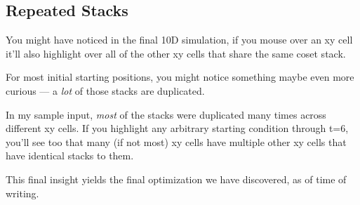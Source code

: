 \documentclass[]{article}
\begin{document}
\hypertarget{repeated-stacks}{%
\subsection{Repeated Stacks}\label{repeated-stacks}}

You might have noticed in the final 10D simulation, if you mouse over an xy cell
it'll also highlight over all of the other xy cells that share the same coset
stack.

For most initial starting positions, you might notice something maybe even more
curious --- a \emph{lot} of those stacks are duplicated.

In my sample input, \emph{most} of the stacks were duplicated many times across
different xy cells. If you highlight any arbitrary starting condition through
t=6, you'll see too that many (if not most) xy cells have multiple other xy
cells that have identical stacks to them.

This final insight yields the final optimization we have discovered, as of time
of writing.
\end{document}

